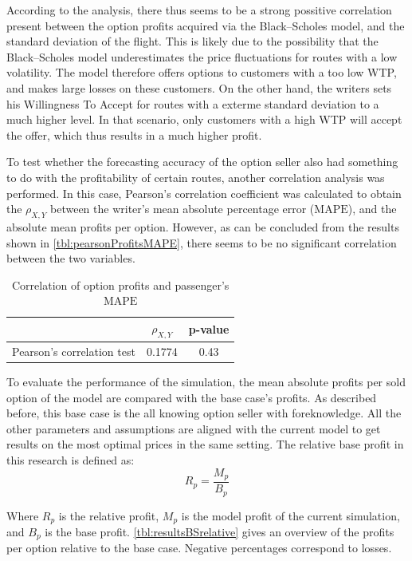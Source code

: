 According to the analysis, there thus seems to be a strong possitive correlation present between the option profits acquired via the Black--Scholes model, and the standard deviation of the flight. This is likely due to the possibility that the Black--Scholes model underestimates the price fluctuations for routes with a low volatility. The model therefore offers options to customers with a too low WTP, and makes large losses on these customers. On the other hand, the writers sets his Willingness To Accept for routes with a exterme standard deviation to a much higher level. In that scenario, only customers with a high WTP will accept the offer, which thus results in a much higher profit. 

To test whether the forecasting accuracy of the option seller also had something to do with the profitability of certain routes, another correlation analysis was performed. In this case, Pearson's correlation coefficient was calculated to obtain the $\rho_{X,Y}$ between the writer's mean absolute percentage error ($\mbox{MAPE}$), and the absolute mean profits per option. However, as can be concluded from the results shown in \autoref{tbl:pearsonProfitsMAPE}, there seems to be no significant correlation between the two variables.

\begin{table}
\centering
\begin{tabular}{l c c}
\toprule
~  &  $\rho_{X,Y}$  &  p-value   \\
\midrule
Pearson's correlation test &  0.1774  &  0.43  \\
\bottomrule
\end{tabular}
\caption{Correlation of option profits and passenger's $\mbox{MAPE}$}
\label{tbl:pearsonProfitsMAPE}
\end{table}


To evaluate the performance of the simulation, the mean absolute profits per sold option of the model are compared with the base case's profits. As described before, this base case is the all knowing option seller with foreknowledge. All the other parameters and assumptions are aligned with the current model to get results on the most optimal prices in the same setting. The relative base profit in this research is defined as:
$$R_p =  \frac{M_p}{B_p}$$

Where $R_p$ is the relative profit, $M_p$ is the model profit of the current simulation, and $B_p$ is the base profit. \autoref{tbl:resultsBSrelative} gives an overview of the profits per option relative to the base case. Negative percentages correspond to losses.


